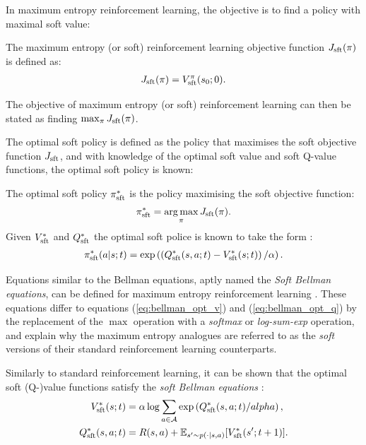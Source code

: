         In maximum entropy reinforcement learning, the objective is to find a policy with maximal soft value:
        \begin{defn}
            \label{def:soft_rl_obj_fn}
            The \textnormal{maximum entropy (or soft) reinforcement learning objective function} $J_{{\textnormal{sft}}}(\pi)$ is defined as:
            \begin{align}
                J_{{\textnormal{sft}}}(\pi) = V_{{\textnormal{sft}}}^{\pi}(s_0;0). \label{eq:soft_rl_obj_fn_def}
            \end{align}

            The objective of maximum entropy (or soft) reinforcement learning can then be stated as finding $\max_{\pi} J_{{\textnormal{sft}}}(\pi)$.
        \end{defn}

        The optimal soft policy is defined as the policy that maximises the soft objective function $J_{{\textnormal{sft}}}$, and with knowledge of the optimal soft value and soft Q-value functions, the optimal soft policy is known:
        \begin{defn}
            \label{def:opt_sft_policy}
            The \textnormal{optimal soft policy} $\pi_{{\textnormal{sft}}}^*$ is the policy maximising the soft objective function:
            \begin{align}
                \pi_{{\textnormal{sft}}}^* = \operatorname*{arg\,max}_\pi J_{{\textnormal{sft}}}(\pi). \label{eq:opt_sft_policy_def}
            \end{align}
            Given $V_{{\textnormal{sft}}}^*$ and $Q_{{\textnormal{sft}}}^*$ the optimal soft police is known to take the form \cite{deep_energy_policies}:
            \begin{align}
                \pi_{{\textnormal{sft}}}^*(a|s;t) = \exp\left(\left(Q_{{\textnormal{sft}}}^*(s,a;t) - V_{{\textnormal{sft}}}^*(s;t)\right) / \alpha \right). \label{eq:opt_sft_policy_from_opt_value_fns}
            \end{align}
        \end{defn}

        Equations similar to the Bellman equations, aptly named the \textit{Soft Bellman equations}, can be defined for maximum entropy reinforcement learning \cite{deep_energy_policies}. These equations differ to equations (\ref{eq:bellman_opt_v}) and (\ref{eq:bellman_opt_q}) by the replacement of the $\max$ operation with a \textit{softmax} or \textit{log-sum-exp} operation, and explain why the maximum entropy analogues are referred to as the \textit{soft} versions of their standard reinforcement learning counterparts.

        Similarly to standard reinforcement learning, it can be shown that the optimal soft (Q-)value functions satisfy the \textit{soft Bellman equations} \cite{deep_energy_policies}:
        \begin{align}
            V_{{\textnormal{sft}}}^*(s;t) &= \alpha \log \sum_{a\in\mathcal{A}} \exp\left( Q_{{\textnormal{sft}}}^*(s,a;t) / alpha \right), \label{eq:sft_bellman_opt_v} \\
            Q_{{\textnormal{sft}}}^*(s,a;t) &= R(s,a) + \mathbb{E}_{s'\sim p(\cdot|s,a)} [V_{{\textnormal{sft}}}^*(s';t+1)]. \label{eq:sft_bellman_opt_q}
        \end{align} 

